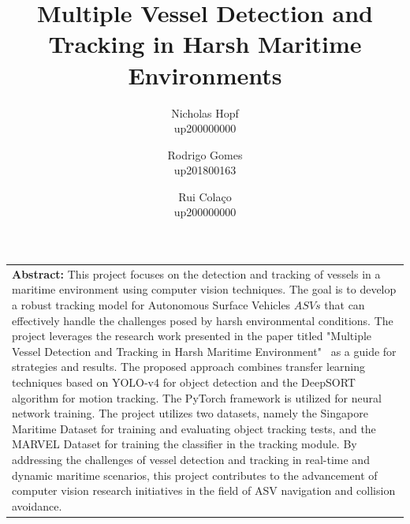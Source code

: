 \documentclass[a4paper,12pt]{article}
\title{
\textbf{Multiple Vessel Detection and Tracking in Harsh Maritime Environments}
}
\author{
    Nicholas Hopf\\
    up200000000
    \and
    Rodrigo Gomes\\
    up201800163
    \and
    Rui Colaço\\
    up200000000
}
\date{\vspace{-3ex}}
\begin{document}
\maketitle


\vspace{10pt}

\begin{table}[h]
	\centering
	\begin{tabular}{p{14cm}}
        {\bf Abstract:} This project focuses on the detection and tracking of vessels in a maritime environment using computer vision techniques. The goal is to develop a robust tracking model for Autonomous Surface Vehicles \(ASVs\) that can effectively handle the challenges posed by harsh environmental conditions. The project leverages the research work presented in the paper titled "Multiple Vessel Detection and Tracking in Harsh Maritime Environment"~\cite{MVDTHME} as a guide for strategies and results. The proposed approach combines transfer learning techniques based on YOLO-v4 for object detection and the DeepSORT algorithm for motion tracking. The PyTorch framework is utilized for neural network training. The project utilizes two datasets, namely the Singapore Maritime Dataset for training and evaluating object tracking tests, and the MARVEL Dataset for training the classifier in the tracking module. By addressing the challenges of vessel detection and tracking in real-time and dynamic maritime scenarios, this project contributes to the advancement of computer vision research initiatives in the field of ASV navigation and collision avoidance.
	\end{tabular}
 
\end{table}
\end{document}

